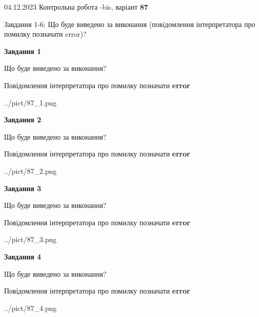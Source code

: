 \documentclass[12pt, ukrainian]{article}
\begin{document}
{{04.12.2023 Контрольна робота -bis, варіант  \No \textbf { 87 }\par}}
{

Завдання 1-6: Що буде виведено за виконання (повідомлення інтерпретатора про помилку позначати error)?


{\begin {center}\textbf{Завдання 1}\end {center}}\par
Що буде виведено за виконання? \par
Повідомлення інтерпретатора про помилку позначати \textbf{error}

\begin{center}
	{../pict/87_1.png}
\end{center}
\newpage

{\begin {center}\textbf{Завдання 2}\end {center}}\par
Що буде виведено за виконання? \par
Повідомлення інтерпретатора про помилку позначати \textbf{error}

\begin{center}
	{../pict/87_2.png}
\end{center}
\newpage

{\begin {center}\textbf{Завдання 3}\end {center}}\par
Що буде виведено за виконання? \par
Повідомлення інтерпретатора про помилку позначати \textbf{error}

\begin{center}
	{../pict/87_3.png}
\end{center}
\newpage

{\begin {center}\textbf{Завдання 4}\end {center}}\par
Що буде виведено за виконання? \par
Повідомлення інтерпретатора про помилку позначати \textbf{error}

\begin{center}
	{../pict/87_4.png}
\end{center}
\newpage

}
\end{document}
